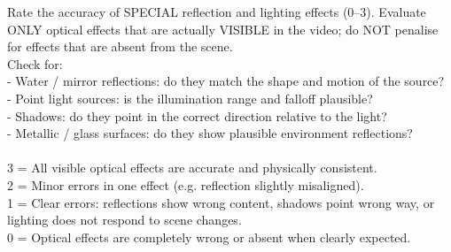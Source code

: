 \documentclass{llmxive}
\begin{document}
\begin{tcolorbox}[d5box, title={Track 2 Rubric --- Reflection \& Lighting}]
\ttfamily\scriptsize
Rate the accuracy of SPECIAL reflection and lighting effects (0--3). Evaluate ONLY optical effects that are actually VISIBLE in the video; do NOT penalise for effects that are absent from the scene.\\
Check for:\\
- Water / mirror reflections: do they match the shape and motion of the source?\\
- Point light sources: is the illumination range and falloff plausible?\\
- Shadows: do they point in the correct direction relative to the light?\\
- Metallic / glass surfaces: do they show plausible environment reflections?\\
\\
3 = All visible optical effects are accurate and physically consistent.\\
2 = Minor errors in one effect (e.g. reflection slightly misaligned).\\
1 = Clear errors: reflections show wrong content, shadows point wrong way, or lighting does not respond to scene changes.\\
0 = Optical effects are completely wrong or absent when clearly expected.
\end{tcolorbox}

\vspace{4pt}
\end{document}
